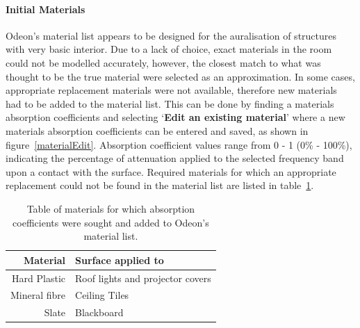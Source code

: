 \documentclass[../../main.tex]{subfiles}
\begin{document}
		\paragraph{Initial Materials}

			Odeon's material list appears to be designed for the auralisation of structures with very basic interior. Due to a lack of choice, exact materials in the room could not be modelled accurately, however, the closest match to what was thought to be the true material were selected as an approximation. In some cases, appropriate replacement materials were not available, therefore new materials had to be added to the material list. This can be done by finding a materials absorption coefficients and selecting `\textbf{Edit an existing material}' where a new materials absorption coefficients can be entered and saved, as shown in figure~\ref{materialEdit}. Absorption coefficient values range from 0 - 1 (0\% - 100\%), indicating the percentage of attenuation applied to the selected frequency band upon a contact with the surface. Required materials for which an appropriate replacement could not be found in the material list are listed in table~\ref{materialTable}.

			\begin{table}[H]
			\begin{center}
				\begin{tabular}{r l}
					\textbf{Material} & \textbf{Surface applied to} \\ \hline
					Hard Plastic \cite{plastic} & Roof lights and projector covers \\
					Mineral fibre \cite{mineralFibre} & Ceiling Tiles \\
					Slate \footnotemark[1] \cite{Kovalchik} & Blackboard \\
				\end{tabular}
			\end{center}
			\caption{Table of materials for which absorption coefficients were sought and added to Odeon's material list.}
			\label{materialTable}
			\end{table}

\end{document}

